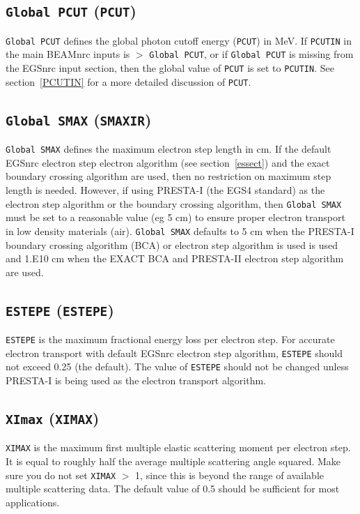 \documentclass[12pt,twoside]{article}
\begin{document}
\subsection{ {\tt Global PCUT} ({\tt PCUT})}
\label{globalpcutsect}
{\tt Global PCUT} defines the global photon cutoff energy ({\tt PCUT})
in MeV.
If {\tt PCUTIN} in the main
BEAMnrc inputs is $>$ {\tt Global PCUT}, or if {\tt Global PCUT} is
missing from the EGSnrc input section, then the global value of
{\tt PCUT} is set to {\tt PCUTIN}.  See section~\ref{PCUTIN} for a more
detailed discussion of {\tt PCUT}.

\subsection{{\tt Global SMAX} ({\tt SMAXIR})}
{\tt Global SMAX} defines the maximum electron step length in cm.  If the
default EGSnrc electron step electron algorithm (see
section~\ref{essect}) and the exact boundary crossing algorithm are used, then no
restriction on maximum step length is needed.  However, if using
PRESTA-I (the EGS4 standard) as the electron step algorithm or the boundary
crossing algorithm, then
{\tt Global SMAX} must be set to a reasonable value (eg 5 cm) to ensure
proper electron transport in low density materials (air).
{\tt Global SMAX} defaults to 5 cm when the PRESTA-I boundary crossing
algorithm (BCA) or electron step algorithm is used is used and 1.E10 cm
when the EXACT BCA and PRESTA-II electron step algorithm are used.

\subsection{{\tt ESTEPE} ({\tt ESTEPE})}
\label{ESTEPE}
{\tt ESTEPE} is the maximum fractional energy loss per electron step.
For accurate electron transport with default EGSnrc electron
step algorithm,  {\tt ESTEPE} should
not exceed 0.25 (the default).  The value of {\tt ESTEPE} should not be changed
unless PRESTA-I is being used as
the electron transport algorithm.

\subsection{{\tt XImax} ({\tt XIMAX})}
{\tt XIMAX} is the maximum first multiple elastic scattering moment per electron
step.  It is equal to roughly half the average multiple scattering angle
squared.  Make sure you do not set {\tt XIMAX} $>$ 1,
since this is beyond the range of available multiple scattering data.
The default value of 0.5 should be sufficient for most applications.
\end{document}
